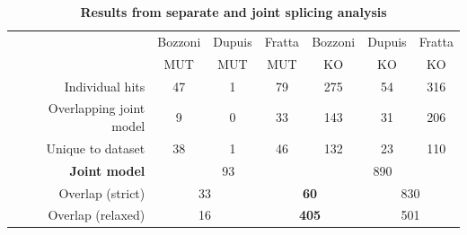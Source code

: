 \begingroup
\renewcommand{\arraystretch}{1.5} 
\begin{table}[h]
	\begin{tabular}{|r|ccc|ccc|}
		\hline
		& Bozzoni & Dupuis & Fratta & Bozzoni & Dupuis & Fratta\\[-0.3cm]
		& MUT & MUT & MUT & KO & KO & KO\\
		\hline
		Individual hits                & 47 & 1 & 79 & 275 & 54 & 316 \\
		Overlapping joint model & 9 & 0 & 33 & 143 & 31 & 206 \\
		Unique to dataset          & 38 & 1 & 46 & 132 & 23 & 110 \\
		\hline
		\textbf{Joint model}       & \multicolumn{3}{c|}{93} & \multicolumn{3}{c|}{890} \\
		\hline
		Overlap (strict)              & \multicolumn{2}{c|}{33} & \multicolumn{2}{c|}{\textbf{60}} & \multicolumn{2}{c|}{830} \\
		Overlap (relaxed)           & \multicolumn{2}{c|}{16} & \multicolumn{2}{c|}{\textbf{405} } & \multicolumn{2}{c|}{501} \\
		\hline
	\end{tabular}
	\caption{\textbf{Results from separate and joint splicing analysis}}
	\label{tab:splicing_results}
\end{table}
\endgroup

